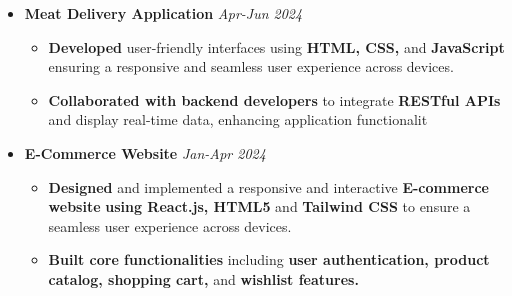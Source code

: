 \documentclass[a4paper,10pt]{article}
\begin{document}
\begin{itemize}

 \vspace{-0.5mm}
\item {\bf Meat Delivery Application}
\textit{\hfill 
{Apr-Jun 2024}
}



\begin{itemize}


\vspace{-2mm}
\item \textbf{Developed} user-friendly interfaces using \textbf{ HTML, CSS,} and \textbf {JavaScript} ensuring a responsive and seamless user experience across devices.

\item \textbf{Collaborated with backend developers } to integrate \textbf{RESTful APIs} and display real-time data, enhancing application functionalit



\vspace{-2mm}
\end{itemize}
\end{itemize}

\begin{itemize}


\item {\bf E-Commerce Website
} 
\textit{\hfill 
{Jan-Apr 2024}
}



\begin{itemize}

\vspace{-1.5mm}
\item \textbf{Designed } and implemented a responsive and interactive \textbf{E-commerce website} \textbf{using React.js, HTML5 } and \textbf{Tailwind CSS} to ensure a seamless user experience across devices.

\item \textbf{Built core functionalities } including \textbf{user authentication, product catalog, shopping cart,} and \textbf{wishlist features.
}


\vspace{-1mm}

\end{itemize}
\end{itemize}
\end{document}
